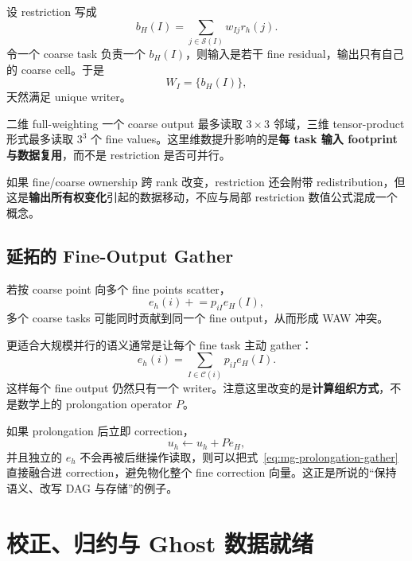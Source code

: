 设 restriction 写成
\begin{equation}
b_H(I)
=
\sum_{j\in\mathcal S(I)}
w_{Ij}r_h(j).
\label{eq:mg-restriction-gather}
\end{equation}
令一个 coarse task 负责一个 $b_H(I)$，则输入是若干 fine residual，输出只有自己的 coarse cell。于是
\begin{equation}
W_I=\{b_H(I)\},
\end{equation}
天然满足 unique writer。

二维 full-weighting 一个 coarse output 最多读取 $3\times3$ 邻域，三维 tensor-product 形式最多读取 $3^3$ 个 fine values。这里维数提升影响的是\textbf{每 task 输入 footprint 与数据复用}，而不是 restriction 是否可并行。

如果 fine/coarse ownership 跨 rank 改变，restriction 还会附带 redistribution，但这是\textbf{输出所有权变化}引起的数据移动，不应与局部 restriction 数值公式混成一个概念。

\subsection{延拓的 Fine-Output Gather}

若按 coarse point 向多个 fine points scatter，
\begin{equation}
e_h(i)\mathrel{+}=p_{iI}e_H(I),
\end{equation}
多个 coarse tasks 可能同时贡献到同一个 fine output，从而形成 WAW 冲突。

更适合大规模并行的语义通常是让每个 fine task 主动 gather：
\begin{equation}
e_h(i)
=
\sum_{I\in\mathcal C(i)}
p_{iI}e_H(I).
\label{eq:mg-prolongation-gather}
\end{equation}
这样每个 fine output 仍然只有一个 writer。注意这里改变的是\textbf{计算组织方式}，不是数学上的 prolongation operator $P$。

如果 prolongation 后立即 correction，
\begin{equation}
u_h\leftarrow u_h+Pe_H,
\end{equation}
并且独立的 $e_h$ 不会再被后继操作读取，则可以把式~\eqref{eq:mg-prolongation-gather}直接融合进 correction，避免物化整个 fine correction 向量。这正是所说的“保持语义、改写 DAG 与存储”的例子。

\section{校正、归约与 Ghost 数据就绪}

